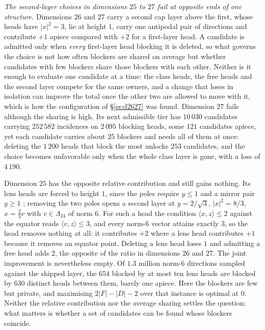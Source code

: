 \documentclass[11pt]{amsart}
\theoremstyle{remark}
\newcommand{\Leech}{\Lambda_{24}}
\newcommand{\ip}[2]{\langle #1,#2\rangle}
\begin{document}
\emph{The second-layer choices in dimensions $25$ to $27$ fail at opposite ends
of one structure.} Dimensions $26$ and $27$ carry a second cap layer above the
first, whose heads have $|x|^{2}=3$, lie at height $1$, carry one antipodal pair
of directions and contribute $+1$ apiece compared with $+2$ for a first-layer head. A
candidate is admitted only when \emph{every} first-layer head blocking it is
deleted, so what governs the choice is not how often blockers are shared on
average but whether candidates with few blockers share those blockers with each
other. Neither is it enough to evaluate one candidate at a time: the class heads, the
free heads and the second layer compete for the same owners, and a change that
loses in isolation can improve the total once the other two are allowed to move with it, which
is how the configuration of \S\ref{ss:d2627} was found. Dimension $27$ fails although the sharing is high. Its next admissible
tier has $10\,030$ candidates carrying $252\,582$ incidences on $2\,095$ blocking
heads, some $121$ candidates apiece, yet each candidate carries about $25$
blockers and needs all of them at once: deleting the $1\,200$ heads that block
the most unlocks $253$ candidates, and the choice becomes unfavorable only when the whole class
layer is gone, with a loss of $4\,190$.

Dimension $25$ has the opposite relative contribution and still gains nothing. Its lens heads
are forced to height $1$, since the poles require $y\le1$ and a mirror pair
$y\ge1$ ; removing the two poles opens a second layer at $y=2/\sqrt3$,
$|x|^{2}=8/3$, $x=\tfrac23v$ with $v\in\Leech$ of norm $6$. For such a head the
condition $\ip{x}{z}\le2$ against the equator reads $\ip{v}{z}\le3$, and every
norm-$6$ vector attains exactly $3$, so the head removes nothing at all: it contributes $+2$ where a lens head contributes $+1$ because it removes an
equator point. Deleting a lens head loses $1$ and admitting a free head adds
$2$, the opposite of the ratio in dimensions $26$ and $27$. The joint improvement is
nevertheless empty. Of $1.3$ million norm-$6$ directions sampled against the
shipped layer, the $654$ blocked by at most ten lens heads are blocked by $630$
distinct heads between them, barely one apiece. Here the blockers are
few but private, and maximising $2|F|-|D|-2$ over that instance is optimal at
$0$. Neither the relative contribution nor the average sharing settles the question;
what matters is whether a set of candidates can be found whose blockers coincide.
\end{document}
